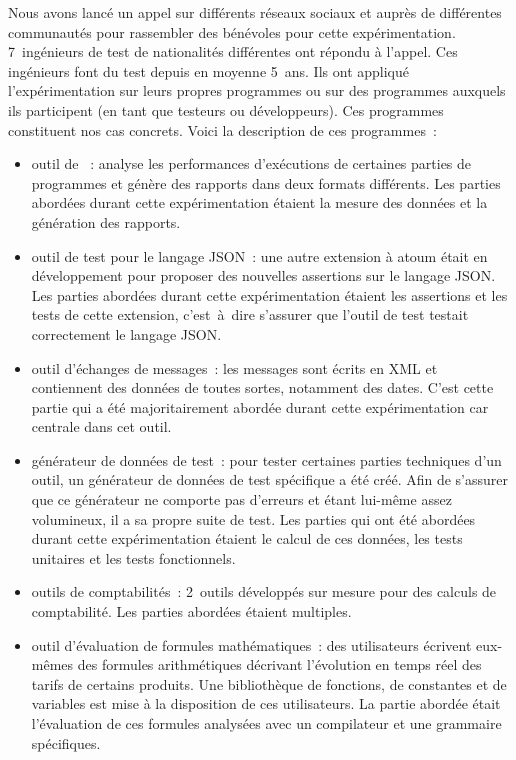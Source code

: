 Nous avons lancé un appel sur différents réseaux sociaux et auprès de
différentes communautés pour rassembler des bénévoles pour cette
expérimentation. 7~ingénieurs de test de nationalités différentes ont répondu à
l'appel. Ces ingénieurs font du test depuis en moyenne 5~ans. Ils ont appliqué
l'expérimentation sur leurs propres programmes ou sur des programmes auxquels
ils participent (en tant que testeurs ou développeurs). Ces programmes
constituent nos cas concrets. Voici la description de ces programmes~:
%
\begin{itemize}

\item outil de ~: analyse les performances d'exécutions de
certaines parties de programmes et génère des rapports dans deux formats
différents. Les parties abordées durant cette expérimentation étaient la mesure
des données et la génération des rapports.

\item outil de test pour le langage JSON~: une autre extension à atoum était en
développement pour proposer des nouvelles assertions sur le langage JSON. Les
parties abordées durant cette expérimentation étaient les assertions et les
tests de cette extension, c'est~à~dire s'assurer que l'outil de test testait
correctement le langage JSON.

\item outil d'échanges de messages~: les messages sont écrits en XML et
contiennent des données de toutes sortes, notamment des dates. C'est cette
partie qui a été majoritairement abordée durant cette expérimentation car
centrale dans cet outil.

\item générateur de données de test~: pour tester certaines parties techniques
d'un outil, un générateur de données de test spécifique a été créé. Afin de
s'assurer que ce générateur ne comporte pas d'erreurs et étant lui-même assez
volumineux, il a sa propre suite de test. Les parties qui ont été abordées
durant cette expérimentation étaient le calcul de ces données, les tests
unitaires et les tests fonctionnels.

\item outils de comptabilités~: 2~outils développés sur mesure pour des calculs
de comptabilité. Les parties abordées étaient multiples.

\item outil d'évaluation de formules mathématiques~: des utilisateurs écrivent
eux-mêmes des formules arithmétiques décrivant l'évolution en temps réel des
tarifs de certains produits. Une bibliothèque de fonctions, de constantes et de
variables est mise à la disposition de ces utilisateurs. La partie abordée était
l'évaluation de ces formules analysées avec un compilateur et une grammaire
spécifiques.

\end{itemize}

